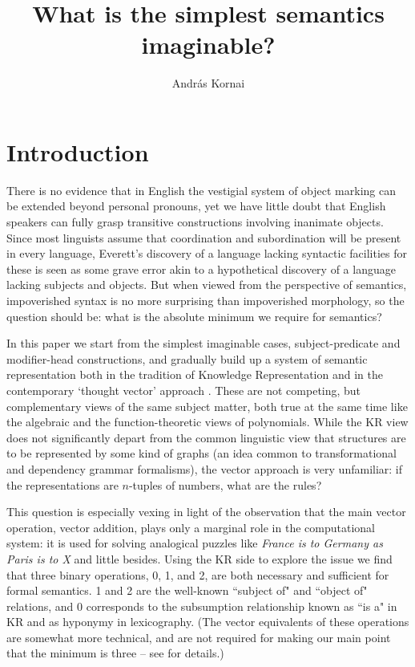 \documentclass[output=paper,colorlinks=true,citecolor=brown]{langscibook}
\author{Andr\'as Kornai}%
\title{What is the simplest semantics imaginable?}
\begin{document}
\maketitle

\section{Introduction}

There is no evidence that in English the vestigial system of object marking can
be extended beyond personal pronouns, yet we have little doubt that English
speakers can fully grasp transitive constructions involving inanimate
objects. Since most linguists assume that coordination and subordination will
be present in every language, Everett's discovery of a language lacking
syntactic facilities for these is seen as some grave error akin to a
hypothetical discovery of a language lacking subjects and objects. But when
viewed from the perspective of semantics, impoverished syntax is no more
surprising than impoverished morphology, so the question should be: what is
the absolute minimum we require for semantics?

In this paper we start from the simplest imaginable cases, subject-predicate
and modifier-head constructions, and gradually build up a system of semantic
representation both in the tradition of Knowledge Representation
\citep{Brachman:2004} and in the contemporary `thought vector' approach
\citep{LeCun:2015,Kornai:2022}. These are not competing, but complementary
views of the same subject matter, both true at the same time like the
algebraic and the function-theoretic views of polynomials. While the KR view
does not significantly depart from the common linguistic view that
structures are to be represented by some kind of graphs (an idea common to
transformational and dependency grammar formalisms), the vector approach is
very unfamiliar: if the representations are $n$-tuples of numbers, what are
the rules?

This question is especially vexing in light of the observation that the main
vector operation, vector addition, plays only a marginal role in the
computational system: it is used for solving analogical puzzles like {\it
  France is to Germany as Paris is to X} \citep{Mikolov:2013l} and little
besides. Using the KR side to explore the issue we find that three binary
operations, 0, 1, and 2, are both necessary and sufficient for formal
semantics. 1 and 2 are the well-known ``subject of" and ``object of"
relations, and 0 corresponds to the subsumption relationship known as ``is a"
in KR and as hyponymy in lexicography. (The vector equivalents of these
operations are somewhat more technical, and are not required for making our
main point that the minimum is three -- see \citet{Kornai:2022} for details.)
\end{document}
